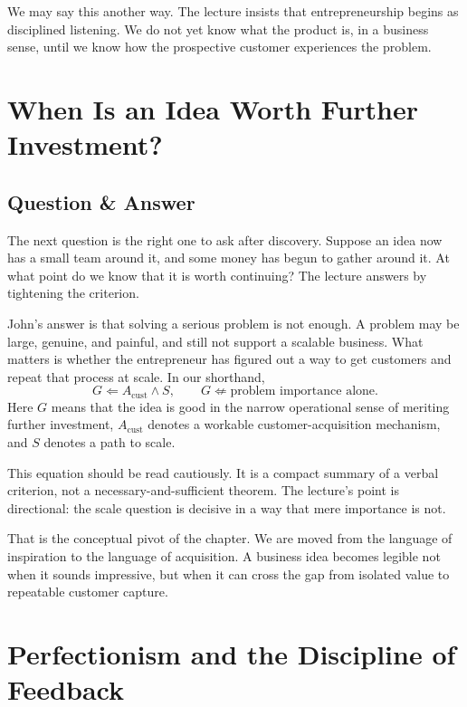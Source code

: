 We may say this another way. The lecture insists that entrepreneurship begins as disciplined listening. We do not yet know what the product is, in a business sense, until we know how the prospective customer experiences the problem.

\section{When Is an Idea Worth Further Investment?}

\subsection{Question \& Answer}

The next question is the right one to ask after discovery. Suppose an idea now has a small team around it, and some money has begun to gather around it. At what point do we know that it is worth continuing? The lecture answers by tightening the criterion.

John's answer is that solving a serious problem is not enough. A problem may be large, genuine, and painful, and still not support a scalable business. What matters is whether the entrepreneur has figured out a way to get customers and repeat that process at scale. In our shorthand,
\begin{equation}
G \Leftarrow A_{\mathrm{cust}} \land S,
\qquad
G \not\Leftarrow \text{problem importance alone}.
\end{equation}
Here \(G\) means that the idea is good in the narrow operational sense of meriting further investment, \(A_{\mathrm{cust}}\) denotes a workable customer-acquisition mechanism, and \(S\) denotes a path to scale.

\begin{remark}
This equation should be read cautiously. It is a compact summary of a verbal criterion, not a necessary-and-sufficient theorem. The lecture's point is directional: the scale question is decisive in a way that mere importance is not.
\end{remark}

That is the conceptual pivot of the chapter. We are moved from the language of inspiration to the language of acquisition. A business idea becomes legible not when it sounds impressive, but when it can cross the gap from isolated value to repeatable customer capture.

\section{Perfectionism and the Discipline of Feedback}

